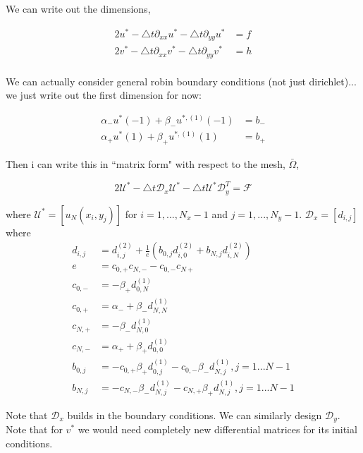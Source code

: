 \documentclass[12pt]{article}
\begin{document}
We can write out the dimensions,

\begin{align*}
2u^* - \bigtriangleup t \partial_{xx} u^* - \bigtriangleup t \partial_{yy} u^* &= f \\
2v^* - \bigtriangleup t \partial_{xx} v^* - \bigtriangleup t \partial_{yy} v^* &= h \\
\end{align*}

We can actually consider general robin boundary conditions (not just dirichlet)... we just write out the first dimension for now:

\begin{align*}
    \alpha_- u^*(-1) + \beta_- u^{*,(1)}(-1) &= b_- \\
    \alpha_+ u^*(1) + \beta_+ u^{*,(1)}(1) &= b_+
\end{align*}

Then i can write this in ``matrix form" with respect to the mesh, $\bar{\Omega}$,

\begin{equation}
    2\mathcal{U}^* - \bigtriangleup t\mathcal{D}_x \mathcal{U}^* - \bigtriangleup t \mathcal{U}^*\mathcal{D}_y^T = \mathcal{F}
    \label{eqn:solve}
\end{equation}

where $\mathcal{U}^* = [u_N(x_i, y_j)]$ for $i=1,  ..., N_x - 1$ and $j = 1, ..., N_y-1$. $\mathcal{D}_x = [d_{i,j}]$ where
\begin{align*}
    d_{i,j} &= d^{(2)}_{i,j} + \frac{1}{e}(b_{0,j} d^{(2)}_{i,0} + b_{N,j} d^{(2)}_{i,N}) \\
    e &=c_{0,+}c_{N,-} - c_{0,-}c_{N+} \\
    c_{0,-} &= -\beta_+ d^{(1)}_{0,N} \\
    c_{0,+} &= \alpha_- + \beta_- d^{(1)}_{N,N} \\
    c_{N,+} &= -\beta_- d^{(1)}_{N,0} \\
    c_{N,-} &= \alpha_+ + \beta_+ d^{(1)}_{0,0} \\
    b_{0,j} &= -c_{0,+} \beta_+ d^{(1)}_{0,j} - c_{0,-}\beta_- d^{(1)}_{N,j}, j = 1...N-1\\
    b_{N,j} &= -c_{N,-} \beta_- d^{(1)}_{N,j} - c_{N,+}\beta_+ d^{(1)}_{N,j}, j = 1...N-1
\end{align*}

Note that $\mathcal{D}_x$ builds in the boundary conditions. We can similarly design $\mathcal{D}_{y}$. Note that for $v^*$ we would need completely new differential matrices for its initial conditions.
\end{document}
